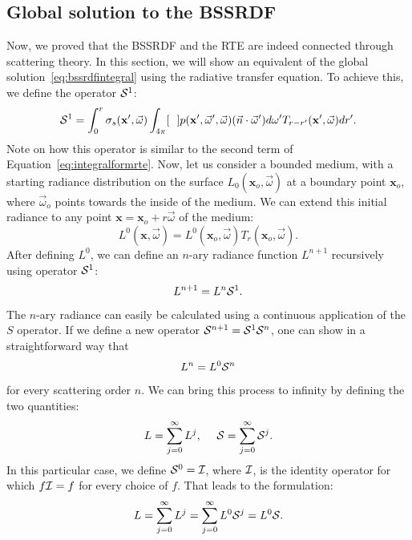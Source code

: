 \subsection{Global solution to the BSSRDF}
Now, we proved that the BSSRDF and the RTE are indeed connected through scattering theory. In this section, we will show an equivalent of the global solution~\ref{eq:bssrdfintegral} using the radiative transfer equation. To achieve this, we define the operator $\mathcal{S}^1$:
\begin{equation*}
\mathcal{S}^1 = \int_0^r \sigma_s(\mathbf{x}', \vec{\omega}) \int_{4\pi} [\ \ ] p(\mathbf{x}', \vec{\omega}', \vec{\omega})  (\vec{n} \cdot \vec{\omega}')  d\omega' T_{r-r'}(\mathbf{x}', \vec{\omega})  dr'.
\end{equation*}
Note on how this operator is similar to the second term of Equation~\ref{eq:integralformrte}. Now, let us consider a bounded medium, with a starting radiance distribution on the surface $L_0(\mathbf{x}_o, \vec{\omega})$ at a boundary point $\mathbf{x}_o$, where $\vec{\omega}_o$ points towards the inside of the medium. We can extend this initial radiance to any point $\mathbf{x} = \mathbf{x}_o + r \vec{\omega}$ of the medium:
\begin{equation*}
L^0(\mathbf{x}, \vec{\omega}) = L^0(\mathbf{x}_o, \vec{\omega}) T_r(\mathbf{x}_o, \vec{\omega}).
\end{equation*}
After defining $L^0$, we can define an $n$-ary radiance function $L^{n+1}$ recursively using operator $\mathcal{S}^1$:
\begin{equation*}
L^{n+1} = L^n \mathcal{S}^1.
\end{equation*}
The $n$-ary radiance can easily be calculated using a continuous application of the $S$ operator. If we define a new operator $\mathcal{S}^{n+1} = \mathcal{S}^1 \mathcal{S}^n$, one can show in a straightforward way that 
\begin{equation*}
L^n = L^0 \mathcal{S}^n
\end{equation*}
for every scattering order $n$.
We can bring this process to infinity by defining the two quantities:
\begin{equation*}
L = \sum_{j=0}^\infty L^j,\ \ \ \ \operator{S} = \sum_{j=0}^\infty \operator{S}^j.
\end{equation*}
In this particular case, we define $\mathcal{S}^0 = \mathcal{I}$, where $\mathcal{I}$, is the identity operator for which $f \mathcal{I} = f$ for every choice of $f$.
That leads to the formulation:
\begin{equation}
\label{eq:funcform}
L =  \sum_{j=0}^\infty L^j = \sum_{j=0}^\infty L^0 \mathcal{S}^j = L^0 \mathcal{S}.
\end{equation}
